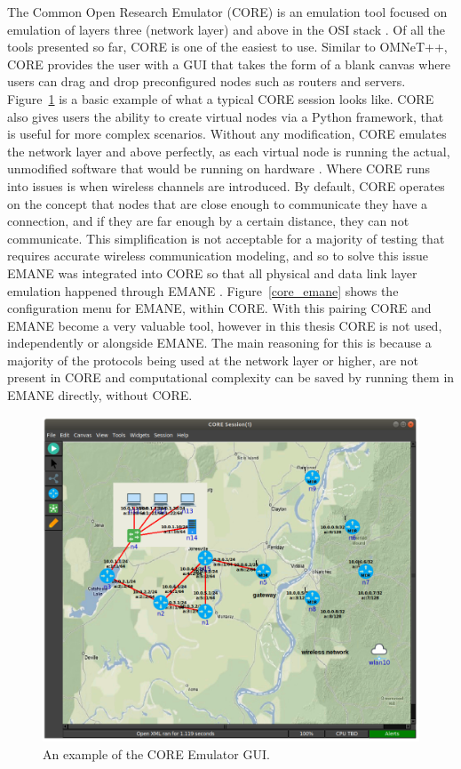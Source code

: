 The Common Open Research Emulator (CORE) is an emulation tool focused on emulation of layers three (network layer) and above in the OSI stack \cite{core}.
Of all the tools presented so far, CORE is one of the easiest to use.
Similar to OMNeT++, CORE provides the user with a GUI that takes the form of a blank canvas where users can drag and drop preconfigured nodes such as routers and servers.
Figure~\ref{core_gui} is a basic example of what a typical CORE session looks like.
CORE also gives users the ability to create virtual nodes via a Python framework, that is useful for more complex scenarios.
Without any modification, CORE emulates the network layer and above perfectly, as each virtual node is running the actual, unmodified software that would be running on hardware \cite{emane_core}.
Where CORE runs into issues is when wireless channels are introduced.
By default, CORE operates on the concept that nodes that are close enough to communicate they have a connection, and if they are far enough by a certain distance, they can not communicate.
This simplification is not acceptable for a majority of testing that requires accurate wireless communication modeling, and so to solve this issue EMANE was integrated into CORE so that all physical and data link layer emulation happened through EMANE \cite{emane_core}.
Figure~\ref{core_emane} shows the configuration menu for EMANE, within CORE.
With this pairing CORE and EMANE become a very valuable tool, however in this thesis CORE is not used, independently or alongside EMANE.
The main reasoning for this is because a majority of the protocols being used at the network layer or higher, are not present in CORE and computational complexity can be saved by running them in EMANE directly, without CORE. \par

\begin{figure}[!ht]
    \centering
    \includegraphics[width=\textwidth,keepaspectratio]{Images/Chpt2/core_gui.png}
    \caption{An example of the CORE Emulator GUI.}
    \label{core_gui}
\end{figure}

